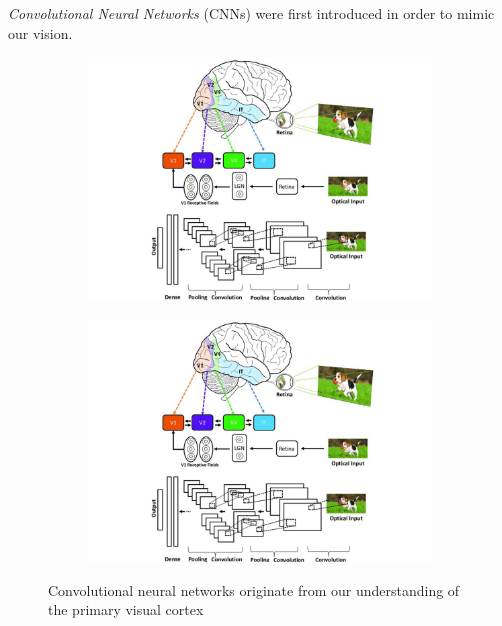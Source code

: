 \documentclass[12pt,a4paper]{report}
\theoremstyle{definition}
\begin{document}
\emph{Convolutional Neural Networks} (CNNs) were first introduced in order to mimic our vision.
\begin{figure}
\centering
\begin{subfigure}{.5\textwidth}
  \centering
  \includegraphics[trim={5cm 7.5cm 5cm 0cm}, clip, width=0.9\linewidth]{Images/visual_cortex.pdf}
\end{subfigure}%
\begin{subfigure}{.5\textwidth}
  \centering
  \includegraphics[trim={5.5cm 0 5.5cm 13cm}, clip,width=0.9\linewidth]{Images/visual_cortex.pdf}
\end{subfigure}
\caption{Convolutional neural networks originate from our understanding of the primary visual cortex}
\label{fig:visual_cortex}
\end{figure}
\end{document}
